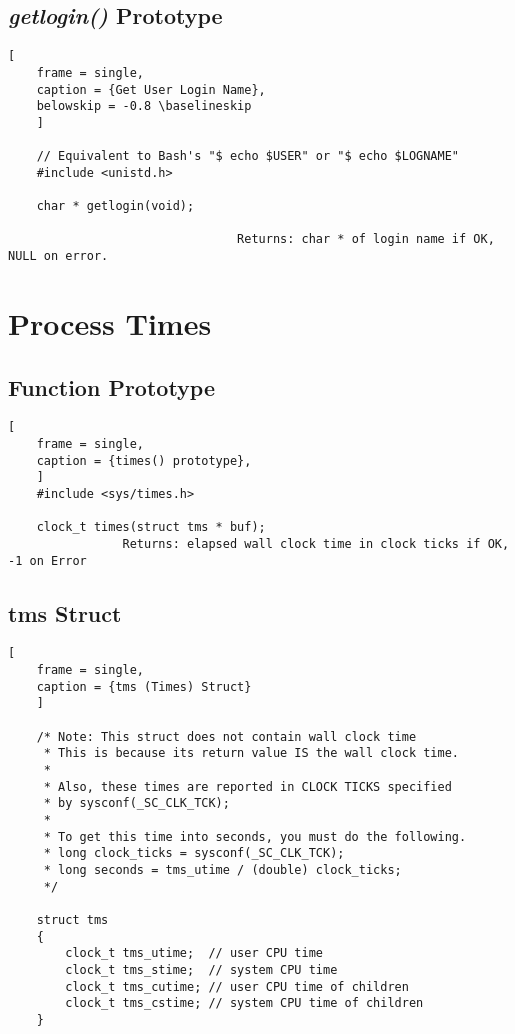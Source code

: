 \documentclass{article}
\newcommand\be[1]{\textbf{\emph{#1}}}
\begin{document}
\subsection{\be{getlogin()} Prototype}
\begin{lstlisting}[
    frame = single,
    caption = {Get User Login Name},
    belowskip = -0.8 \baselineskip
    ]
    
    // Equivalent to Bash's "$ echo $USER" or "$ echo $LOGNAME"
    #include <unistd.h>

    char * getlogin(void);

                                Returns: char * of login name if OK, NULL on error.
\end{lstlisting}

\section{Process Times}
\subsection{Function Prototype}
\begin{lstlisting}[
    frame = single,
    caption = {times() prototype},
    ]
    #include <sys/times.h>

    clock_t times(struct tms * buf);
                Returns: elapsed wall clock time in clock ticks if OK, -1 on Error
\end{lstlisting}
\subsection{tms Struct}
\begin{lstlisting}[
    frame = single,
    caption = {tms (Times) Struct}
    ]

    /* Note: This struct does not contain wall clock time
     * This is because its return value IS the wall clock time.
     *
     * Also, these times are reported in CLOCK TICKS specified
     * by sysconf(_SC_CLK_TCK);
     * 
     * To get this time into seconds, you must do the following.
     * long clock_ticks = sysconf(_SC_CLK_TCK);
     * long seconds = tms_utime / (double) clock_ticks;
     */

    struct tms
    {
        clock_t tms_utime;  // user CPU time
        clock_t tms_stime;  // system CPU time
        clock_t tms_cutime; // user CPU time of children
        clock_t tms_cstime; // system CPU time of children
    }
\end{lstlisting}
\end{document}
